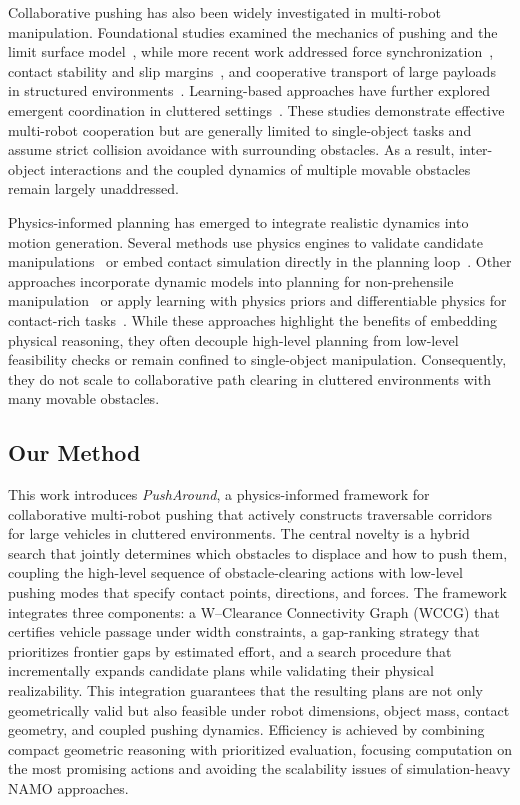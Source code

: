 Collaborative pushing has also been widely investigated in multi-robot
manipulation. Foundational studies examined the mechanics of pushing and the
limit surface model~\cite{goyal1989limit,lynch1992manipulation}, while more
recent work addressed force synchronization~\cite{ni2023progressive}, contact
stability and slip margins~\cite{liu2025physics,chen2015occlusion}, and
cooperative transport of large payloads in structured
environments~\cite{ni2024physics,wang2006multi}. Learning-based approaches have
further explored emergent coordination in cluttered
settings~\cite{feng2025learning}. These studies demonstrate effective
multi-robot cooperation but are generally limited to single-object tasks and
assume strict collision avoidance with surrounding obstacles. As a result,
inter-object interactions and the coupled dynamics of multiple movable
obstacles remain largely unaddressed.

Physics-informed planning has emerged to integrate realistic dynamics into
motion generation. Several methods use physics engines to validate candidate
manipulations~\cite{lin2019efficient} or embed contact simulation directly in
the planning loop~\cite{rouxel2024multi}. Other approaches incorporate dynamic
models into planning for non-prehensile manipulation~\cite{zhou2017pushing,hou2020physics}
or apply learning with physics priors and differentiable physics for
contact-rich tasks~\cite{agrawal2016learning,ha2018reinforcement,ni2023progressive,liu2025physics}.
While these approaches highlight the benefits of embedding physical reasoning,
they often decouple high-level planning from low-level feasibility checks or
remain confined to single-object manipulation. Consequently, they do not scale
to collaborative path clearing in cluttered environments with many movable
obstacles.


\subsection{Our Method}\label{subsec:intro-our}
This work introduces \emph{PushAround}, a physics-informed framework for
collaborative multi-robot pushing that actively constructs traversable
corridors for large vehicles in cluttered environments. The central novelty is
a hybrid search that jointly determines which obstacles to displace and how to
push them, coupling the high-level sequence of obstacle-clearing actions with
low-level pushing modes that specify contact points, directions, and forces.
The framework integrates three components: a W--Clearance Connectivity Graph
(WCCG) that certifies vehicle passage under width constraints, a gap-ranking
strategy that prioritizes frontier gaps by estimated effort, and a search
procedure that incrementally expands candidate plans while validating their
physical realizability. This integration guarantees that the resulting plans
are not only geometrically valid but also feasible under robot dimensions,
object mass, contact geometry, and coupled pushing dynamics. Efficiency is
achieved by combining compact geometric reasoning with prioritized evaluation,
focusing computation on the most promising actions and avoiding the scalability
issues of simulation-heavy NAMO approaches.

